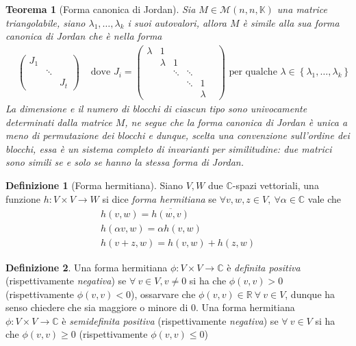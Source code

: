\documentclass[11pt]{article}
\theoremstyle{plain}
\newtheorem{thm}{Teorema}[section]
\theoremstyle{definition}
\newtheorem{defn}{Definizione}[section]
\theoremstyle{remark}
\newcommand{\C}{\mathbb{C}}
\newcommand{\R}{\mathbb{R}}
\newcommand{\K}{\mathbb{K}}
\begin{document}
\begin{thm}[Forma canonica di Jordan]
	Sia $M\in \mathcal{M}(n,n,\K)$ una matrice triangolabile, siano $\lambda_1,\ldots,\lambda_k$ i suoi autovalori, allora $M$ è simile alla sua \textit{forma canonica di Jordan} che è nella forma
	\begin{align*}
		&\begin{pmatrix}
			J_1 & & \\
			& \ddots & \\
			& & J_t
		\end{pmatrix}
		&\text{ dove }J_i=\begin{pmatrix}
		                  	\lambda & 1 & & & \\
							& \lambda & 1 & & \\
		                  	& & \ddots & \ddots & \\
		                  	& & & \ddots & 1 & \\
		                  	& & & & \lambda
		                  \end{pmatrix} \text{ per qualche }\lambda \in \left\{ \lambda_1,\ldots,\lambda_k \right\}
	\end{align*}
	La dimensione e il numero di blocchi di ciascun tipo sono univocamente determinati dalla matrice $M$, ne segue che la forma canonica di Jordan è unica a meno di permutazione dei blocchi e dunque, scelta una convenzione sull'ordine dei blocchi, essa è un sistema completo di invarianti per similitudine: due matrici sono simili se e solo se hanno la stessa forma di Jordan.

\end{thm}
\begin{defn}[Forma hermitiana]
Siano $V,W$ due $\C$-spazi vettoriali, una funzione $h:V\times V\to W$ si dice \textit{forma hermitiana} se $\forall v,w,z\in V,\ \forall \alpha \in \C$ vale che
\begin{gather*}
	h(v,w) = \overline{h(w,v)}\\
	h(\alpha v, w) = \alpha h(v,w)\\
	h(v+z,w)=h(v,w)+h(z,w)
\end{gather*}
\end{defn}

\begin{defn}
	Una forma hermitiana $\phi:V\times V\to \C$ è \textit{definita positiva} (rispettivamente \textit{negativa}) se $\forall\ v\in V, v\neq 0$ si ha che $\phi(v,v)>0$ (rispettivamente $\phi(v,v)<0$), ossarvare che $\phi(v,v)\in \R\ \forall\ v\in V$, dunque ha senso chiedere che sia maggiore o minore di $0$.\newline
	Una forma hermitiana $\phi:V\times V\to \C$ è \textit{semidefinita positiva} (rispettivamente \textit{negativa}) se $\forall\ v\in V$ si ha che $\phi(v,v)\geq 0$ (rispettivamente $\phi(v,v)\leq 0$)
\end{defn}
\end{document}
